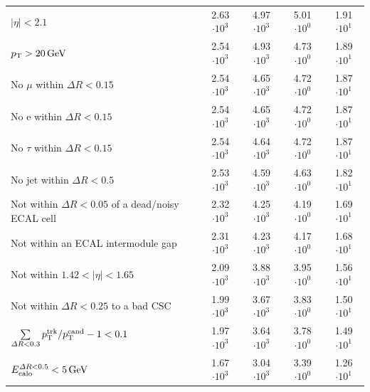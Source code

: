 \begin{table}[!h]
{\begin{tabular}{|l|c|c|c|c|}
$|\eta|<2.1$                                                                              & 2.63 $\cdot10^{3 }$ & 4.97 $\cdot10^{3 }$ & 5.01 $\cdot10^{0 }$ & 1.91 $\cdot10^{1 }$ \\
$p_{\text{T}}>20\,\text{Ge}\kern-0.06667em\text{V}$                                                                              & 2.54 $\cdot10^{3 }$ & 4.93 $\cdot10^{3 }$ & 4.73 $\cdot10^{0 }$ & 1.89 $\cdot10^{1 }$ \\
No $\mu$ within $\Delta R<0.15$                                                           & 2.54 $\cdot10^{3 }$ & 4.65 $\cdot10^{3 }$ & 4.72 $\cdot10^{0 }$ & 1.87 $\cdot10^{1 }$ \\
No e within $\Delta R<0.15$                                                               & 2.54 $\cdot10^{3 }$ & 4.65 $\cdot10^{3 }$ & 4.72 $\cdot10^{0 }$ & 1.87 $\cdot10^{1 }$ \\
No $\tau$ within $\Delta R<0.15$                                                          & 2.54 $\cdot10^{3 }$ & 4.64 $\cdot10^{3 }$ & 4.72 $\cdot10^{0 }$ & 1.87 $\cdot10^{1 }$ \\
No jet within $\Delta R<0.5$                                                              & 2.53 $\cdot10^{3 }$ & 4.59 $\cdot10^{3 }$ & 4.63 $\cdot10^{0 }$ & 1.82 $\cdot10^{1 }$ \\
\makecell[l]{Not within $\Delta R<0.05$ of \\\hfill a dead/noisy ECAL cell}               & 2.32 $\cdot10^{3 }$ & 4.25 $\cdot10^{3 }$ & 4.19 $\cdot10^{0 }$ & 1.69 $\cdot10^{1 }$ \\
Not within an ECAL  intermodule gap                                                       & 2.31 $\cdot10^{3 }$ & 4.23 $\cdot10^{3 }$ & 4.17 $\cdot10^{0 }$ & 1.68 $\cdot10^{1 }$ \\
Not within $1.42<|\eta|<1.65$                                                             & 2.09 $\cdot10^{3 }$ & 3.88 $\cdot10^{3 }$ & 3.95 $\cdot10^{0 }$ & 1.56 $\cdot10^{1 }$ \\
Not within $\Delta R<0.25$ to a bad CSC                                                   & 1.99 $\cdot10^{3 }$ & 3.67 $\cdot10^{3 }$ & 3.83 $\cdot10^{0 }$ & 1.50 $\cdot10^{1 }$ \\
$\sum \limits_{\Delta R < 0.3} p_{\text{T}}^{\text{trk}}/p_{\text{T}}^{\text{cand}} -1 < 0.1$                         & 1.97 $\cdot10^{3 }$ & 3.64 $\cdot10^{3 }$ & 3.78 $\cdot10^{0 }$ & 1.49 $\cdot10^{1 }$ \\
$E^{\Delta R<0.5}_{\text{calo}}<5\,\text{Ge}\kern-0.06667em\text{V}$                                                                            & 1.67 $\cdot10^{3 }$ & 3.04 $\cdot10^{3 }$ & 3.39 $\cdot10^{0 }$ & 1.26 $\cdot10^{1 }$ \\
\bottomrule
\end{tabular}}
\end{table}  

